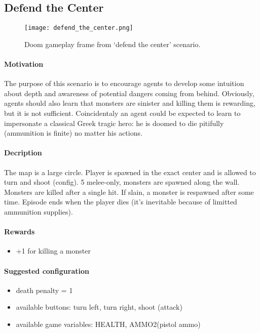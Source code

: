 	\subsection{Defend the Center}\label{subsec:defend_the_center}
		\begin{figure}
			\centering
			\texttt{[image: defend\_the\_center.png]}
			\caption{Doom gameplay frame from `defend the center' scenario.}\label{fig:defend_the_center}
		\end{figure}
		\paragraph{Motivation} 
			The purpose of this scenario is to encourage agents to develop some intuition about depth and awareness of potential dangers coming from behind. Obviously, agents should also learn that monsters are sinister and killing them is rewarding, but it is not sufficient. Coincidentaly an agent could be expected to learn to impersonate a classical Greek tragic hero: he is doomed to die pitifully (ammunition is finite) no matter his actions.

		\paragraph{Decription}
			The map is a large circle. Player is spawned in the exact center and is allowed to turn and shoot (config). 5 melee-only, monsters are spawned along the wall. Monsters are killed after a single hit. If slain, a monster is respawned after some time. Episode ends when the player dies (it's inevitable because of limitted ammunition supplies).

		\paragraph{Rewards}
			\begin{itemize}
				\item +1 for killing a monster
			\end{itemize}
		
		\paragraph{Suggested configuration}
			\begin{itemize}
				\item death penalty = 1
				\item available buttons: turn left, turn right, shoot (attack)
				\item available game variables: HEALTH, AMMO2(pistol ammo)
			\end{itemize}
	\newpage

